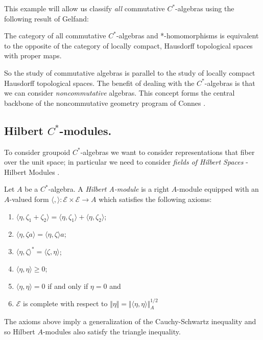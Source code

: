 \begin{example}
This example will allow us classify \textit{all} commutative $C^{*}$-algebras using the following result of Gelfand:

\begin{theorem}
The category of all commutative $C^{*}$-algebras and *-homomorphisms is equivalent to the opposite of the category of locally compact, Hausdorff topological spaces with proper maps.
\end{theorem}

So the study of commutative algebras is parallel to the study of locally compact Hausdorff topological spaces. The benefit of dealing with the $C^{*}$-algebras is that we can consider \textit{noncommutative} algebras. This concept forms the central backbone of the noncommutative geometry program of Connes \cite{MR1826266}.

\subsection{Hilbert $C^{*}$-modules.}
To consider groupoid $C^{*}$-algebras we want to consider representations that fiber over the unit space; in particular we need to consider \textit{fields of Hilbert Spaces} - Hilbert Modules \cite{MR1325694}.

\begin{definition}
Let $A$ be a $C^{*}$-algebra. A \textit{Hilbert A-module}  is a right $A$-module equipped with an $A$-valued form $\langle , \rangle: \mathscr{E} \times \mathscr{E} \rightarrow A$ which satisfies the following axioms:
\begin{enumerate}
\item $\langle \eta ,\zeta_{1} + \zeta_{2} \rangle = \langle \eta , \zeta_{1}\rangle + \langle \eta ,\zeta_{2} \rangle$;
\item $\langle \eta , \zeta a \rangle = \langle \eta ,\zeta \rangle a$;
\item $\langle \eta , \zeta \rangle^{*} = \langle \zeta ,\eta \rangle$;
\item $\langle \eta, \eta \rangle \geq 0$;
\item $\langle \eta ,\eta  \rangle = 0 $ if and only if $ \eta = 0$ and
\item $\mathscr{E}$ is complete with respect to $\Vert \eta \Vert = \Vert \langle \eta , \eta \rangle \Vert_{A}^{1/2}$
\end{enumerate}
\end{definition}

\begin{remark}
The axioms above imply a generalization of the Cauchy-Schwartz inequality and so Hilbert $A$-modules also satisfy the triangle inequality.
\end{remark}


\end{example}

